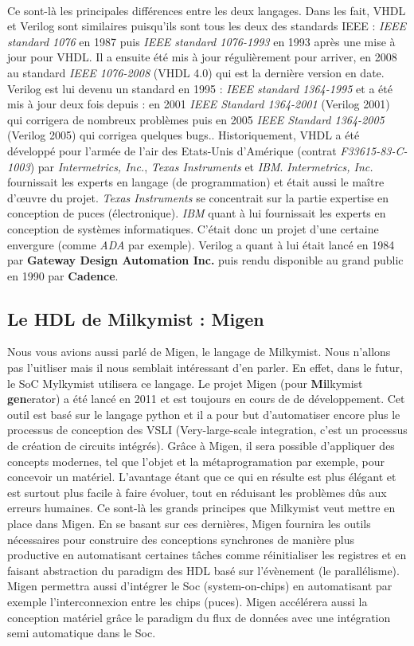 \\
\par
Ce sont-là les principales différences entre les deux langages. Dans les fait, VHDL et Verilog sont similaires puisqu'ils sont tous les deux des standards IEEE : \textit{IEEE standard 1076} en 1987 puis \textit{IEEE standard 1076-1993} en 1993 après une mise à jour pour VHDL. Il a ensuite été mis à jour régulièrement pour arriver, en 2008 au standard \textit{IEEE 1076-2008} (VHDL 4.0) qui est la dernière version en date. Verilog est lui devenu un standard en 1995 : \textit{IEEE standard 1364-1995} et a été mis à jour deux fois depuis : en 2001  \textit{IEEE Standard 1364-2001} (Verilog 2001) qui corrigera de nombreux problèmes puis en 2005  \textit{IEEE Standard 1364-2005} (Verilog 2005) qui corrigea quelques bugs.. Historiquement, VHDL a été développé pour l'armée de l'air des Etats-Unis d'Amérique (contrat \textit{F33615-83-C-1003}) par \textit{Intermetrics, Inc.}, \textit{Texas Instruments} et \textit{IBM}. \textit{Intermetrics, Inc.}  fournissait les experts en langage (de programmation) et était aussi le maître d'\oe{}uvre du projet. \textit{Texas Instruments} se concentrait sur la partie expertise en conception de puces (électronique). \textit{IBM} quant à lui fournissait les experts en conception de systèmes informatiques. C'était donc un projet d'une certaine envergure (comme \textit{ADA} par exemple). Verilog a quant à lui était lancé en 1984 par \textbf{Gateway Design Automation Inc.}  puis rendu disponible au grand public en 1990 par \textbf{Cadence}.

\subsection{Le HDL de Milkymist : Migen}
\vspace{15px}
Nous vous avions aussi parlé de Migen, le langage de Milkymist. Nous n'allons pas l'uitliser mais il nous semblait intéressant d'en parler. En effet, dans le futur, le SoC Mylkymist utilisera ce langage. Le projet Migen (pour \textbf{Mi}lkymist \textbf{gen}erator) a été lancé en 2011 et est toujours en cours de de développement. Cet outil est basé sur le langage python et il a pour but d'automatiser encore plus le processus de conception des VSLI (Very-large-scale integration, c'est un processus de création de circuits intégrés). Grâce à Migen, il sera possible d'appliquer des concepts modernes, tel que l'objet et la métaprogramation par exemple, pour concevoir un matériel. L'avantage étant que ce qui en résulte est plus élégant et est surtout plus facile à faire évoluer, tout en réduisant les problèmes dûs aux erreurs humaines. Ce sont-là les grands principes que Milkymist veut mettre en place dans Migen. En se basant sur ces dernières, Migen fournira les outils nécessaires pour construire des conceptions synchrones de manière plus productive en automatisant certaines tâches comme réinitialiser les registres et en faisant abstraction du paradigm des HDL basé sur l'évènement (le parallélisme). Migen permettra aussi d'intégrer le Soc (system-on-chips) en automatisant par exemple l'interconnexion entre les chips (puces). Migen accélérera aussi la conception matériel grâce le paradigm du flux de données avec une intégration semi automatique dans le Soc.

